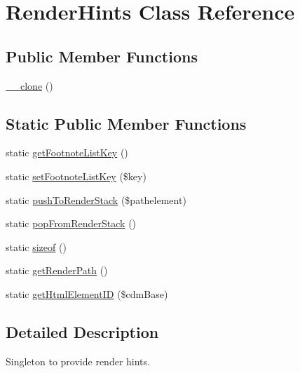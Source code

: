 \hypertarget{class_render_hints}{\section{Render\-Hints Class Reference}
\label{class_render_hints}
}
\subsection*{Public Member Functions}
\begin{DoxyCompactItemize}
\item 
\hyperlink{class_render_hints_ac4bc35c09eb88236cd95ea0a908ae292}{\-\_\-\-\_\-clone} ()
\end{DoxyCompactItemize}
\subsection*{Static Public Member Functions}
\begin{DoxyCompactItemize}
\item 
static \hyperlink{class_render_hints_a69f1d65e001848d8bb66a9594f2ad15a}{get\-Footnote\-List\-Key} ()
\item 
static \hyperlink{class_render_hints_a2b32b34b16d5818e0f12e1f634707c1a}{set\-Footnote\-List\-Key} (\$key)
\item 
static \hyperlink{class_render_hints_abd603c5e7e9d7a40569f29da268b6f4e}{push\-To\-Render\-Stack} (\$pathelement)
\item 
static \hyperlink{class_render_hints_a031f96e814de945a5dff85ec49c618d9}{pop\-From\-Render\-Stack} ()
\item 
static \hyperlink{class_render_hints_ab4152aea5430dacfe6de87e8db067716}{sizeof} ()
\item 
static \hyperlink{class_render_hints_ad04d75287b099a9e55da6a11ba1a5160}{get\-Render\-Path} ()
\item 
static \hyperlink{class_render_hints_a6dec5f177d963d016dd899f21a49b92d}{get\-Html\-Element\-I\-D} (\$cdm\-Base)
\end{DoxyCompactItemize}


\subsection{Detailed Description}
Singleton to provide render hints. 

